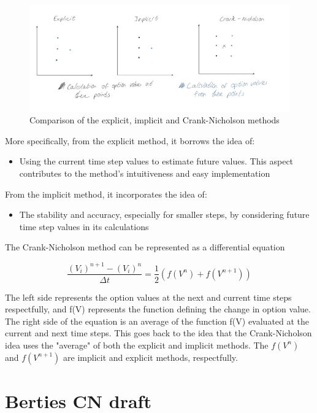 \documentclass[11pt]{article}
\begin{document}
\begin{figure}[H]
    \centering
    \includegraphics[width=1\linewidth]{Crank-Nicholson-GR.jpg}
    \caption{Comparison of the explicit, implicit and Crank-Nicholson methods}
    \label{}
\end{figure}

More specifically, from the explicit method, it borrows the idea of:

\begin{itemize}

\item Using the current time step values to estimate future values. This aspect contributes to the method's intuitiveness and easy implementation
\end{itemize}
From the implicit method, it incorporates the idea of:
\begin{itemize}
\item The stability and accuracy, especially for smaller steps, by considering future time step values in its calculations
\end{itemize}

The Crank-Nicholson method can be represented as a differential equation

\[
\frac{{(V_i)^{n+1} - (V_i)^n}}{{\Delta t}} = \frac{1}{2} \left( f(V^n) + f(V^{n+1}) \right)
\]

The left side represents the option values at the next and current time steps respectfully, and f(V) represents the function defining the change in option value. The right side of the equation is an average of the function f(V) evaluated at the current and next time steps. This goes back to the idea that the Crank-Nicholson idea uses the "average" of both the explicit and implicit methods. The \( f(V^n) \) and \( f(V^{n+1}) \) are implicit and explicit methods, respectfully.







\section{Berties CN draft}
\end{document}
